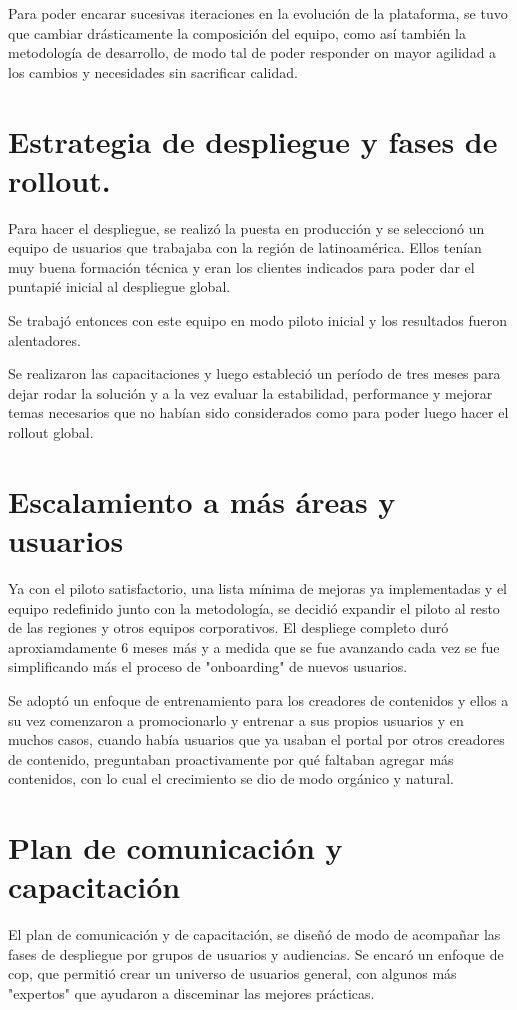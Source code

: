 Para poder encarar sucesivas iteraciones en la evolución de la plataforma, se tuvo que cambiar drásticamente la composición del equipo, como así también la metodología de desarrollo, de modo tal de poder responder on mayor agilidad a los cambios y necesidades sin sacrificar calidad.

\section{Estrategia de despliegue y fases de rollout.}

Para hacer el despliegue, se realizó la puesta en producción y se seleccionó un equipo de usuarios que trabajaba con la región de latinoamérica. Ellos tenían muy buena formación técnica y eran los clientes indicados para poder dar el puntapié inicial al despliegue global.

Se trabajó entonces con este equipo en modo piloto inicial y los resultados fueron alentadores. 

Se realizaron las capacitaciones y luego estableció un período de tres meses para dejar rodar la solución y a la vez evaluar la estabilidad, performance y mejorar temas necesarios que no habían sido considerados como para poder luego hacer el rollout global.

\section{Escalamiento a más áreas y usuarios}

Ya con el piloto satisfactorio, una lista mínima de mejoras ya implementadas y el equipo redefinido junto con la metodología, se decidió expandir el piloto al resto de las regiones y otros equipos corporativos. El despliege completo duró aproxiamdamente 6 meses más y a medida que se fue avanzando cada vez se fue simplificando más el proceso de "onboarding" de nuevos usuarios.

Se adoptó un enfoque de entrenamiento para los creadores de contenidos y ellos a su vez comenzaron a promocionarlo y entrenar a sus propios usuarios y en muchos casos, cuando había usuarios que ya usaban el portal por otros creadores de contenido, preguntaban proactivamente por qué faltaban agregar más contenidos, con lo cual el crecimiento se dio de modo orgánico y natural.

\section{Plan de comunicación y capacitación}
El plan de comunicación y de capacitación, se diseñó de modo de acompañar las fases de despliegue por grupos de usuarios y audiencias. Se encaró un enfoque de \gls{cop}, que permitió crear un universo de usuarios general, con algunos más "expertos" que ayudaron a disceminar las mejores prácticas. 

